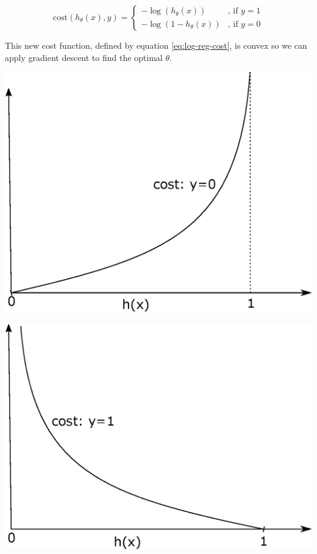\documentclass[a4paper,11pt]{report}
\newcommand{\cost}{\mathrm{cost}}
\begin{document}
$$\cost(h_\theta(x), y) = \left\{\begin{matrix}
                                    -\log(h_\theta(x)) & \text{, if } y = 1 \\
                                    -\log(1 - h_\theta(x)) & \text{, if } y = 0
                                  \end{matrix}\right.$$

This new cost function, defined by equation \eqref{eq:log-reg-cost}, is convex so we can apply gradient descent to find the optimal $\theta$.

\hspace{1.0in}

\begin{center}
\begin{minipage}{0.48\textwidth}
 \centering
 \includegraphics[width=.8\linewidth]{ml_images/cost_0}
\end{minipage}\hfill
\begin{minipage}{0.48\textwidth}
 \centering
 \includegraphics[width=.8\linewidth]{ml_images/cost_1}
\end{minipage}
\end{center}
\end{document}
